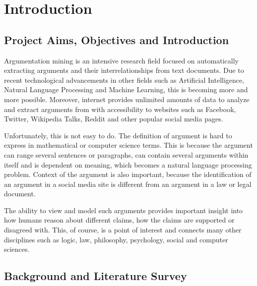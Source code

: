 \section{Introduction}
\subsection{Project Aims, Objectives and Introduction} 
 Argumentation mining is an intensive research field focused on automatically extracting arguments and their interrelationships from text documents. Due to recent technological advancements in other fields such as Artificial Intelligence, Natural Language Processing and Machine Learning, this is becoming more and more possible. Moreover, internet provides unlimited amounts of data to analyze and extract arguments from with accessibility to websites such as Facebook, Twitter, Wikipedia Talks, Reddit and other popular social media pages. 
 
 Unfortunately, this is not easy to do. The definition of argument is hard to express in mathematical or computer science terms. This is because the argument can range several sentences or paragraphs, can contain several arguments within itself and is dependent on meaning, which becomes a natural language processing problem. Context of the argument is also important, because the identification of an argument in a social media site is different from an argument in a law or legal document.

The ability to view and model such arguments provides important insight into how humans reason about different claims, how the claims are supported or disagreed with. This, of course, is a point of interest and connects many other disciplines such as logic, law, philosophy, psychology, social and computer sciences. 

\subsection{Background and Literature Survey} \label{sub:background}

